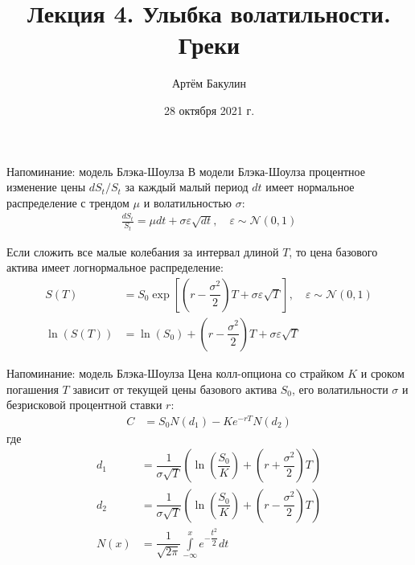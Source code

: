 \documentclass{beamer}
\title{Лекция 4. Улыбка волатильности. Греки}
\author{Артём Бакулин}
\date{28 октября 2021 г.}
\begin{document}
\begin{frame}
\titlepage
\end{frame}



\begin{frame}{Напоминание: модель Блэка-Шоулза}
\justify
В модели Блэка-Шоулза процентное изменение цены $dS_t/S_t$ за каждый малый период $dt$ имеет нормальное распределение с трендом $\mu$ и волатильностью $\sigma$:
\begin{align*}
\frac{dS_t}{S_t} = \mu dt + \sigma\varepsilon\sqrt{dt}, \quad \varepsilon \sim \mathcal{N}(0, 1)
\end{align*}

\justify
Если сложить все малые колебания за интервал длиной $T$, то цена базового актива имеет логнормальное распределение:
\begin{align*}
S(T) &= S_0 \exp\left[\left(r - \dfrac{\sigma^2}{2}\right)T + \sigma\varepsilon\sqrt{T}\right], \quad \varepsilon \sim \mathcal{N}(0, 1) \\
\ln\left(S(T)\right) &= \ln\left(S_0\right) + \left(r - \dfrac{\sigma^2}{2}\right)T + \sigma\varepsilon\sqrt{T}
\end{align*}
\end{frame}



\begin{frame}{Напоминание: модель Блэка-Шоулза}
\justify
Цена колл-опциона со страйком $K$ и сроком погашения $T$ зависит от текущей цены базового актива $S_0$, его волатильности $\sigma$ и безрисковой процентной ставки $r$:
\begin{align*}
C &= S_0N(d_1) - Ke^{-rT}N(d_2)
\end{align*}
где
\begin{align*}
d_1 &= \dfrac{1}{\sigma\sqrt{T}}\left( \ln\left(\dfrac{S_0}{K}\right) + \left(r + \dfrac{\sigma^2}{2}\right)T\right) \\
d_2 &= \dfrac{1}{\sigma\sqrt{T}}\left( \ln\left(\dfrac{S_0}{K}\right) + \left(r - \dfrac{\sigma^2}{2}\right)T\right) \\
N(x) &= \dfrac{1}{\sqrt{2\pi}}\int\limits_{-\infty}^x e^{-\dfrac{t^2}{2}}dt
\end{align*}
\end{frame}
\end{document}
